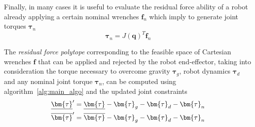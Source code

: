 Finally, in many cases it is useful to evaluate the residual force ability of a robot already applying a certain nominal wrenches $\bm{f}_{n}$ which imply to generate joint torques $\bm{\tau}_{n}$
\begin{equation}
\bm{\tau}_{n} =  J(\bm{q})^T \bm{f}_{n}  
\end{equation}

The \textit{residual force polytope} \cite{ferrolho_residual_2020} corresponding to the  feasible space of Cartesian wrenches $\bm{f}$ that can be applied and rejected by the robot end-effector, taking into consideration the torque necessary to overcome gravity $\bm{\tau}_{g}$, robot dynamics $\bm{\tau}_{d}$ and any nominal joint torque $\bm{\tau}_{n}$, can be computed using algorithm~\ref{alg:main_algo} and the updated joint constraints
\begin{equation}
\begin{split}
    \unum{\bm{\tau}}' &= \unum{\bm{\tau}} - \bm{\tau}_g - \bm{\tau}_{d} - \bm{\tau}_{n}  \\ 
    \onum{\bm{\tau}}' &= \onum{\bm{\tau}}  - \bm{\tau}_g - \bm{\tau}_{d} - \bm{\tau}_{n}
    \label{eq:residual_constraints}
\end{split}
\end{equation}



